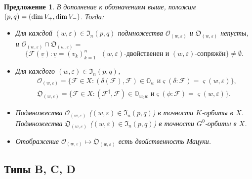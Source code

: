 \documentclass{amsart}
\newtheorem{proposition}{Предложение}
\theoremstyle{definition}
\begin{document}
\begin{proposition}
\label{P2}
В дополнение к обозначениям выше, положим $(p,q)=\\ (\dim V_+,\dim V_-)$. Тогда:
\begin{itemize}
\item[\rm (a)] Для каждой $(w,\varepsilon)\in\mathfrak{I}_n(p,q)$ подмножества $\mathcal{O}_{(w,\varepsilon)}$ и $\mathfrak{O}_{(w,\varepsilon)}$ непусты, и
$\mathcal{O}_{(w,\varepsilon)}\cap\mathfrak{O}_{(w,\varepsilon)}= $
\[\{\mathcal{F}(\underline{v}):\mbox{$\underline{v}=(v_k)_{k=1}^n$  $(w,\varepsilon)$-двойственен и $(w,\varepsilon)$-сопряжён}\} \not=\emptyset.\]
\item[\rm (b)]
Для каждого $(w,\varepsilon)\in \mathfrak{I}_n(p,q)$,
\begin{eqnarray*}
 & \mathcal{O}_{(w,\varepsilon)}=\big\{\mathcal{F}\in
X: (\delta(\mathcal{F}),\mathcal{F})\in\mathbb{O}_{w}\mbox{ и
}\varsigma(\delta:\mathcal{F})=\varsigma(w,\varepsilon)\big\}, \\
 &\mathfrak{O}_{(w,\varepsilon)}=\big\{\mathcal{F}\in X:
(\mathcal{F}^\dag,\mathcal{F})\in\mathbb{O}_{w_0w}\mbox{ и
}\varsigma(\phi:\mathcal{F})=\varsigma(w,\varepsilon)\big\}.
\end{eqnarray*}
\item[\rm (c)]
Подмножества $\mathcal{O}_{(w,\varepsilon)}$
($(w,\varepsilon)\in\mathfrak{I}_n(p,q)$) в точности  $K$-орбиты
в $X$. Подмножества $\mathfrak{O}_{(w,\varepsilon)}$
($(w,\varepsilon)\in\mathfrak{I}_n(p,q)$) в точности
$G^0$-орбиты в $X$.
\item[\rm (d)]
Отображение
$\mathcal{O}_{(w,\varepsilon)}\mapsto\mathfrak{O}_{(w,\varepsilon)}$
есть двойственность Мацуки.
\end{itemize}
\end{proposition}

\subsection{Типы B, C, D}

\label{S3.3}
\end{document}

